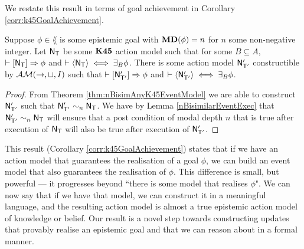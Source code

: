 We restate this result in terms of goal achievement in Corollary
\ref{corr:k45GoalAchievement}.

\begin{corr} \label{corr:k45GoalAchievement}
  Suppose $\phi \in \lang$ is some epistemic goal with ${\bf MD}(\phi) = n$ for $n$
  some non-negative integer.
  Let $\mathrm{\mathsf{N}}_\mathrm{\mathsf{T}}$ be some $\bf K45$ action model such that for some $B
  \subseteq A$, $\vdash [{\mathrm{\mathsf{N}}_\mathrm{\mathsf{T}}}] \Rightarrow \phi$ and $\vdash
  \langle { \ensuremath {\mathrm{\mathsf{N}}} _ \ensuremath {\mathrm{\mathsf{T}}} } \rangle \iff \exists_B \phi$.
  There is some action model $\mathrm{\mathsf{N}}'_{\mathrm{\mathsf{T}}'}$ constructible by $\mathcal{AM}(\to,\sqcup,I)$
  such that $\vdash [{\mathrm{\mathsf{N}}'_{\mathrm{\mathsf{T}}'}}] \Rightarrow \phi$ and $\vdash
  \langle { \ensuremath {\mathrm{\mathsf{N}}} '_{ \ensuremath {\mathrm{\mathsf{T}}} '}} \rangle \iff \exists_B \phi$.
\end{corr}
\begin{proof}
  From Theorem \ref{thm:nBisimAnyK45EventModel} we are able to construct
  $\mathrm{\mathsf{N}}'_{\mathrm{\mathsf{T}}'}$ such that $\mathrm{\mathsf{N}}'_{\mathrm{\mathsf{T}}'} \sim_n \mathrm{\mathsf{N}}_\mathrm{\mathsf{T}}$.
  We have by Lemma \ref{nBisimilarEventExec} that $\mathrm{\mathsf{N}}'_{\mathrm{\mathsf{T}}'} \sim_n
  \mathrm{\mathsf{N}}_\mathrm{\mathsf{T}}$ will ensure that a post condition of modal depth $n$ that is true
  after execution of $\mathrm{\mathsf{N}}_\mathrm{\mathsf{T}}$ will also be true after execution of
  $\mathrm{\mathsf{N}}'_{\mathrm{\mathsf{T}}'}$.
\end{proof}

This result (Corollary \ref{corr:k45GoalAchievement}) states
that if we have an action model that guarantees the realisation of a goal $\phi$, we can build an event
model that also guarantees the realisation of $\phi$.
This difference is small, but powerful --- it progresses beyond ``there is some model that realises
$\phi$".
We can now say that if we have that model, we can construct it in a meaningful language, and the
resulting action model is almost a true epistemic action model of knowledge or belief.
Our result is a novel step towards constructing updates that provably realise an epistemic goal and
that we can reason about in a formal manner.
